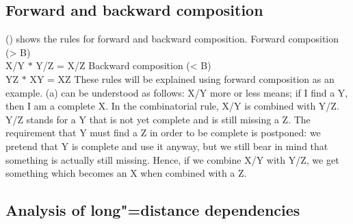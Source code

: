 \subsection{Forward and backward composition}
\label{Kategorialgrammatik-Komposition}

() shows the rules for forward and backward composition.
\eal
\ex\label{Regel-Vorwaertskomposition}
 Forward composition (> B)\\
    X/Y $*$ Y/Z = X/Z 
\ex Backward composition (< B)\\
    Y\bs Z $*$ X\bs Y = X\bs Z
\zl 
These rules will be explained using forward composition as an example. (a) can be understood as follows: X/Y more or less means; if I find a Y, then I am a complete X.
In the combinatorial rule, X/Y is combined with Y/Z. Y/Z stands for a Y that is not yet complete and is
still missing a Z. The requirement that Y must find a Z in order
to be complete is postponed: we pretend that Y is complete and use it anyway, but we still bear in mind that
something is actually still missing. Hence, if we combine X/Y with Y/Z, we get something which becomes an X when combined with a Z. 

\subsection{Analysis of long"=distance dependencies}
\label{Abschnitt-CG-UDC}

